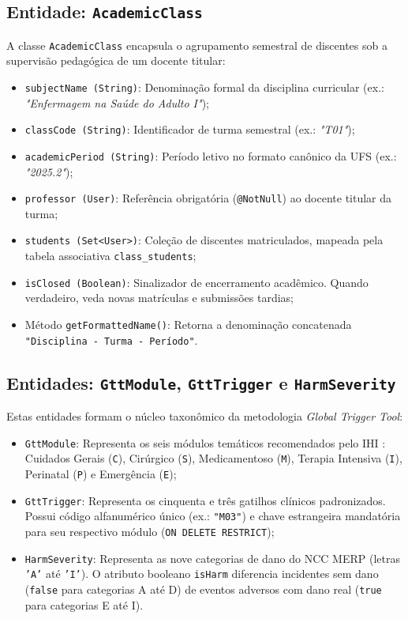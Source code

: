 \subsection{Entidade: \texttt{AcademicClass}}
A classe \texttt{AcademicClass} encapsula o agrupamento semestral de discentes sob a supervisão pedagógica de um docente titular:
\begin{itemize}
    \item \texttt{subjectName (String)}: Denominação formal da disciplina curricular (ex.: \textit{"Enfermagem na Saúde do Adulto I"});
    \item \texttt{classCode (String)}: Identificador de turma semestral (ex.: \textit{"T01"});
    \item \texttt{academicPeriod (String)}: Período letivo no formato canônico da UFS (ex.: \textit{"2025.2"});
    \item \texttt{professor (User)}: Referência obrigatória (\texttt{@NotNull}) ao docente titular da turma;
    \item \texttt{students (Set<User>)}: Coleção de discentes matriculados, mapeada pela tabela associativa \texttt{class\_students};
    \item \texttt{isClosed (Boolean)}: Sinalizador de encerramento acadêmico. Quando verdadeiro, veda novas matrículas e submissões tardias;
    \item Método \texttt{getFormattedName()}: Retorna a denominação concatenada \texttt{"Disciplina - Turma - Período"}.
\end{itemize}

\subsection{Entidades: \texttt{GttModule}, \texttt{GttTrigger} e \texttt{HarmSeverity}}
Estas entidades formam o núcleo taxonômico da metodologia \textit{Global Trigger Tool}:
\begin{itemize}
    \item \texttt{GttModule}: Representa os seis módulos temáticos recomendados pelo IHI \cite{ihi2009}: Cuidados Gerais (\texttt{C}), Cirúrgico (\texttt{S}), Medicamentoso (\texttt{M}), Terapia Intensiva (\texttt{I}), Perinatal (\texttt{P}) e Emergência (\texttt{E});
    \item \texttt{GttTrigger}: Representa os cinquenta e três gatilhos clínicos padronizados. Possui código alfanumérico único (ex.: \texttt{"M03"}) e chave estrangeira mandatória para seu respectivo módulo (\texttt{ON DELETE RESTRICT});
    \item \texttt{HarmSeverity}: Representa as nove categorias de dano do NCC MERP \cite{nccmerp2001} (letras \texttt{'A'} até \texttt{'I'}). O atributo booleano \texttt{isHarm} diferencia incidentes sem dano (\texttt{false} para categorias A até D) de eventos adversos com dano real (\texttt{true} para categorias E até I).
\end{itemize}

